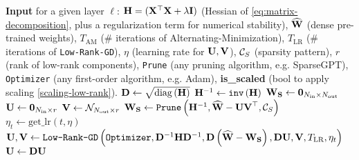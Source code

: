 \begin{algorithm}[h]
    \caption{\ourframework}
    \label{algo:gdprune}
    \begin{algorithmic}[]
        \State \textbf{Input} for a given layer $\ell$: $\mathbf{H} = (\mathbf{X}^\top\mathbf{X} + \lambda \mathbf{I})$ (Hessian of \eqref{eq:matrix-decomposition}, plus a regularization term for numerical stability), $\widehat{\mathbf{W}}$ (dense pre-trained weights), $T_{\text{AM}}$ (\# iterations of Alternating-Minimization), $T_{\text{LR}}$ (\# iterations of \texttt{Low-Rank-GD}), $\eta$ (learning rate for $\mathbf{U}, \mathbf{V}$), $\mathcal{C}_S$ (sparsity pattern), $r$ (rank of low-rank components), \texttt{Prune} (any pruning algorithm, e.g. SparseGPT), \texttt{Optimizer} (any first-order algorithm, e.g. Adam), \textbf{is\_scaled} (bool to apply scaling \ref{scaling-low-rank}).
        \vspace*{0.1em}
        \State $\mathbf{D} \gets \sqrt{\operatorname{diag}\left({\mathbf{H}}\right)}$ \quad {}
        \State $\mathbf{H}^{-1} \gets \texttt{inv}\left({\mathbf{H}}\right)$ \quad {}
        \State $\mathbf{W_S} \gets \mathbf{0}_{N_{\text{in}} \times N_{\text{out}}}$
        \State $\mathbf{U} \gets \mathbf{0}_{N_{\text{in}} \times r}$
        \State $\mathbf{V} \gets \mathcal{N}_{N_{\text{out}} \times r}$ \quad  {}
            \State $\mathbf{W_S} \gets \texttt{Prune}\left({\mathbf{H}^{-1}, \widehat{\mathbf{W}} - \mathbf{UV}^\top, \mathcal{C}_S}\right)$
            \State {}
            \vspace*{0.2em}
            \State $\eta_t \gets \text{get\_lr}(t, \eta)$ \quad {}
            \vspace*{0.2em}
                \State $\mathbf{U}, \mathbf{V} \gets \texttt{Low-Rank-GD}\left({\texttt{Optimizer}, \mathbf{D}^{-1}\mathbf{H}\mathbf{D}^{-1}, \mathbf{D}\left({\widehat{\mathbf{W}} - \mathbf{W_S}}\right), \mathbf{D}\mathbf{U}, \mathbf{V}, T_{\text{LR}}, \eta_t}\right)$
                \State $\mathbf{U} \gets \mathbf{D} \mathbf{U}$ \quad {}

\end{algorithmic}
\end{algorithm}

